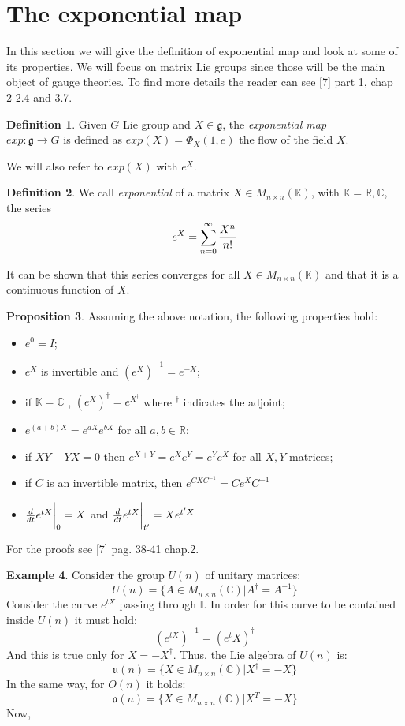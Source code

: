 \documentclass[12pt,a4paper]{report}
\theoremstyle{definition}
\newtheorem{Def}{Definition}[chapter]
\theoremstyle{Theorem}
\newtheorem{Prop}[Def]{Proposition}
\theoremstyle{definition}
\newtheorem{Ex}[Def]{Example}
\theoremstyle{definition}
\begin{document}
	\section{The exponential map}
	In this section we will give the definition of exponential map and look at some of its properties. We will focus on matrix Lie groups since those will be the main object of gauge theories.
	To find more details the reader can see [7] part 1, chap 2-2.4 and 3.7.
	\begin{Def}
		Given $G$ Lie group and $X\in\mathfrak{g}$, the \textit{exponential map} \\$exp:\mathfrak{g}\rightarrow G$ is defined as $exp(X)=\Phi_X(1,e)$ the flow of the field $X$.
	\end{Def}
	We will also refer to $exp(X)$ with $e^X$.
	\begin{Def}
		We call \textit{exponential} of a matrix $X\in M_{n\times n}(\mathbb{K})$, with $\mathbb{K}=\mathbb{R},\mathbb{C}$, the series $$e^X=\sum_{n=0}^{\infty}{X^n\over n! }$$ 
	\end{Def}
	It can be shown that this series converges for all $X\in M_{n\times n}(\mathbb{K})$ and that it is a continuous function of $X$.
	\begin{Prop}
		Assuming the above notation, the following properties hold:
		\begin{itemize}
			\item $e^0=I$;
			\item $e^X$ is invertible and $(e^X)^{-1}=e^{-X}$;
			\item if $\mathbb{K}=\mathbb{C}$ , $(e^X)^\dagger=e^{X^\dagger}$ where $^\dagger$ indicates the adjoint;
			\item $e^{(a+b)X}=e^{aX}e^{bX}$ for all $a,b\in\mathbb{R}$;
			\item if $XY-YX=0$ then $e^{X+Y}=e^Xe^Y=e^Ye^X$ for all $X,Y$ matrices;\\
			\item if $C$ is an invertible matrix, then $e^{CXC^{-1}}=Ce^XC^{-1}$
			\item ${d\over dt}e^{tX}\bigg{\rvert}_0=X$ and ${d\over dt}e^{tX}\bigg{\rvert}_{t'}=Xe^{t'X}$
		\end{itemize}
	\end{Prop} 
	For the proofs see [7] pag. 38-41 chap.2.\\
	\begin{Ex}\label{Ex_2.5.1}
		Consider the group $U(n)$ of unitary matrices:
		$$U(n)=\{A\in M_{n\times n}(\mathbb{C})|A^\dagger=A^{-1}\}$$
		Consider the curve $e^{tX}$ passing through $\mathbb{I}$. In order for this curve to be contained inside $U(n)$ it must hold:
		$$(e^{tX})^{-1}=(e^tX)^\dagger$$
		And this is true only for $X=-X^\dagger$. Thus, the Lie algebra of $U(n)$ is:
		$$\mathfrak{u}(n)=\{X\in M_{n\times n}(\mathbb{C})|X^\dagger=-X\}$$
		In the same way, for $O(n)$ it holds:
		$$\mathfrak{o}(n)=\{X\in M_{n\times n}(\mathbb{C})| X^T=-X\}$$
		Now, 
	\end{Ex}
\end{document}
